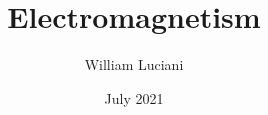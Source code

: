 \documentclass{article}
\title{ Electromagnetism }
\author{William Luciani}
\date{July 2021}
\numberwithin{equation}{section}
\begin{document}
\maketitle

\tableofcontents

\pagebreak















\end{document}
